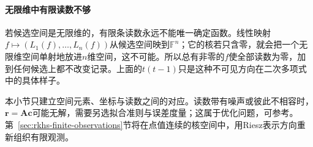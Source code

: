 \paragraph{无限维中有限读数不够}
若候选空间是无限维的，有限条读数永远不能唯一确定函数。线性映射$f\mapsto(L_1(f),\ldots,L_n(f))$从候选空间映到$\mathbb F^n$；它的核若只含零，就会把一个无限维空间单射地放进$n$维空间，这不可能。所以总有非零的$f$使全部读数为零，加到任何候选上都不改变记录。上面的$t(t-1)$只是这种不可见方向在二次多项式中的具体样子。

本小节只建立空间元素、坐标与读数之间的对应。读数带有噪声或彼此不相容时，$\bm r=\bm A\bm c$可能无解，需要另选拟合准则与误差度量；这属于优化问题，可参考。第~\ref{sec:rkhs-finite-observations}节将在点值连续的核空间中，用Riesz表示方向重新组织有限观测。
